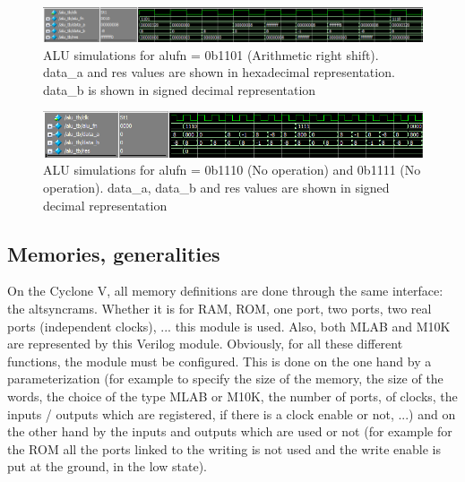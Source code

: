 \begin{figure}[H]
    \centering
    \includegraphics[width=\linewidth]{Chapter3-CPU/res/alu_simu_3_2.PNG}
    \caption{ALU simulations for alufn = 0b1101 (Arithmetic right shift). data\_a and
    res values are shown in hexadecimal representation. data\_b is shown in signed decimal 
    representation}
    \label{fig:sim/alu_6}
\end{figure}

\begin{figure}[H]
    \centering
    \includegraphics[width=\linewidth]{Chapter3-CPU/res/alu_simu_4.PNG}
    \caption{ALU simulations for alufn = 0b1110 (No operation) and 0b1111 (No operation).
     data\_a, data\_b and res values are shown in signed decimal 
    representation}
    \label{fig:sim/alu_7}
\end{figure}

\subsection{Memories, generalities}

On the Cyclone V, all memory definitions are done through the same interface: the altsyncrams. 
Whether it is for RAM, ROM, one port, two ports, two real ports (independent clocks), ... this 
module is used. Also, both MLAB and M10K are represented by this Verilog module. 
Obviously, for all these different functions, the module must be configured. This is done on 
the one hand by a parameterization (for example to specify the size of the memory, the size of the 
words, the choice of the type MLAB or M10K, the number of ports, of clocks, the inputs / outputs 
which are registered, if there is a clock enable or not, ...) and on the other hand by the inputs 
and outputs which are used or not (for example for the ROM all the ports linked to the writing is not 
used and the write enable is put at the ground, in the low state). 

